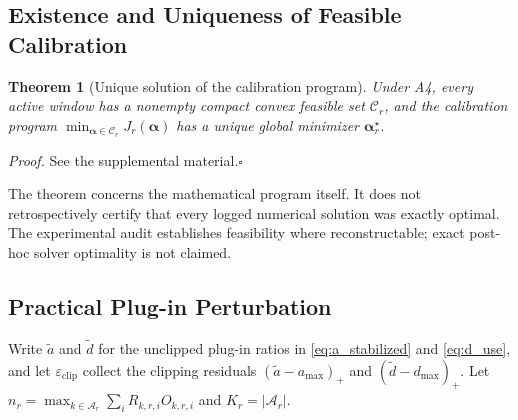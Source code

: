 \documentclass[letterpaper,journal]{IEEEtran}
\newtheorem{theorem}{Theorem}
\begin{document}
\subsection{Existence and Uniqueness of Feasible Calibration}
\label{subsec:theorem_calibration}

\begin{theorem}[Unique solution of the calibration program]
\label{thm:calibration}
Under A4, every active window has a nonempty compact convex feasible set
$\mathcal{C}_r$, and the calibration program
$\min_{\boldsymbol\alpha\in\mathcal{C}_r}J_r(\boldsymbol\alpha)$
has a unique global minimizer $\boldsymbol\alpha_r^\star$.
\end{theorem}

\noindent\emph{Proof.}
See the supplemental material.\hfill$\square$

The theorem concerns the mathematical program itself.  It does not
retrospectively certify that every logged numerical solution was exactly
optimal.  The experimental audit establishes feasibility where reconstructable;
exact post-hoc solver optimality is not claimed.

\subsection{Practical Plug-in Perturbation}
\label{subsec:prop_plugin}

Write $\widetilde a$ and $\widetilde d$ for the unclipped plug-in ratios
in \eqref{eq:a_stabilized} and \eqref{eq:d_use}, and let
$\varepsilon_{\mathrm{clip}}$ collect the clipping residuals
$(\widetilde a-a_{\max})_+$ and $(\widetilde d-d_{\max})_+$.
Let $n_r=\max_{k\in\mathcal{A}_r}\sum_i R_{k,r,i}O_{k,r,i}$ and
$K_r=|\mathcal{A}_r|$.
\end{document}
